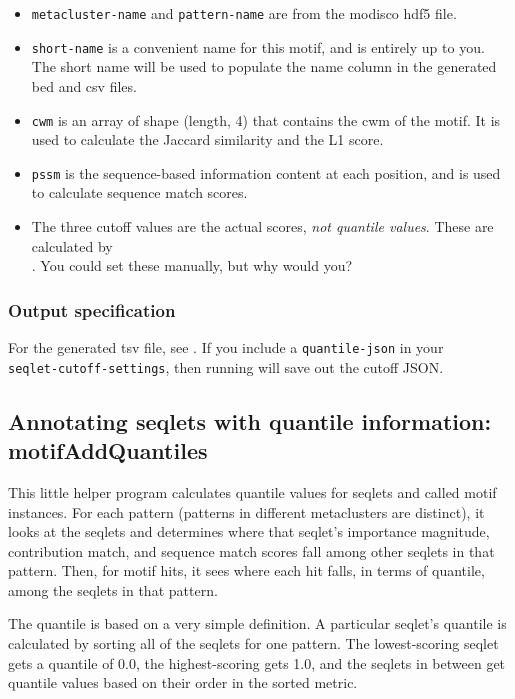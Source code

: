 \documentclass{article}
\begin{document}
\begin{itemize}
    \item \texttt{metacluster-name} and \texttt{pattern-name} are from the modisco hdf5 file.
    \item \texttt{short-name} is a convenient name for this motif, and is entirely up to you.
        The short name will be used to populate the name column in the generated bed and csv files.
    \item \texttt{cwm} is an array of shape (length, 4) that contains the cwm of the motif.
        It is used to calculate the Jaccard similarity and the L1 score.
    \item \texttt{pssm} is the sequence-based information content at each position, and is
        used to calculate sequence match scores.
    \item The three cutoff values are the actual scores, \emph{not quantile values}.
        These are calculated by \\ . You could set these
        manually, but why would you?
\end{itemize}

\subsubsection{Output specification}
For the generated tsv file, see .
If you include a \texttt{quantile-json} in your \\ \texttt{seqlet-cutoff-settings}, then
running  will save out the cutoff JSON.


\newpage


\subsection{Annotating seqlets with quantile information: {motifAddQuantiles}}\label{prog:motifAddQuantiles}

This little helper program calculates quantile values for seqlets and called motif instances.
For each pattern (patterns in different metaclusters are distinct), it looks at the seqlets
and determines where that seqlet's importance magnitude, contribution match, and sequence match
scores fall among other seqlets in that pattern.
Then, for motif hits, it sees where each hit falls, in terms of quantile, among the seqlets
in that pattern.

The quantile is based on a very simple definition. A particular seqlet's quantile is calculated by
sorting all of the seqlets for one pattern. The lowest-scoring seqlet gets a quantile of 0.0,
the highest-scoring gets 1.0, and the seqlets in between get quantile values based on their
order in the sorted metric.
\end{document}
